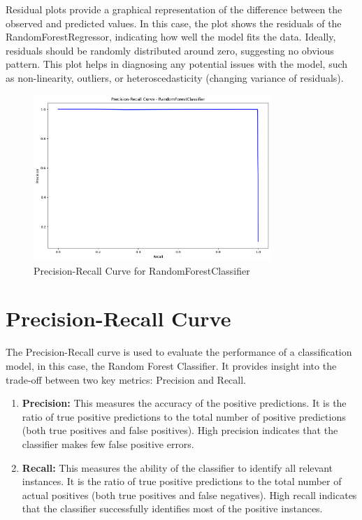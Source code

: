 \documentclass{article}
\begin{document}
Residual plots provide a graphical representation of the difference between the observed and predicted values. In this case, the plot shows the residuals of the RandomForestRegressor, indicating how well the model fits the data. Ideally, residuals should be randomly distributed around zero, suggesting no obvious pattern. This plot helps in diagnosing any potential issues with the model, such as non-linearity, outliers, or heteroscedasticity (changing variance of residuals).

\begin{figure}[H]
    \centering
    \includegraphics[width=0.8\textwidth]{images/precision_recall_curve.png} %
    \caption{Precision-Recall Curve for RandomForestClassifier}
    \label{fig:precision_recall_curve}
\end{figure}

\section*{Precision-Recall Curve}

The Precision-Recall curve is used to evaluate the performance of a classification model, in this case, the Random Forest Classifier. It provides insight into the trade-off between two key metrics: Precision and Recall.

\begin{enumerate}
\item \textbf{Precision:} This measures the accuracy of the positive predictions. It is the ratio of true positive predictions to the total number of positive predictions (both true positives and false positives). High precision indicates that the classifier makes few false positive errors.
\item \textbf{Recall:} This measures the ability of the classifier to identify all relevant instances. It is the ratio of true positive predictions to the total number of actual positives (both true positives and false negatives). High recall indicates that the classifier successfully identifies most of the positive instances.
\end{enumerate}
\end{document}
